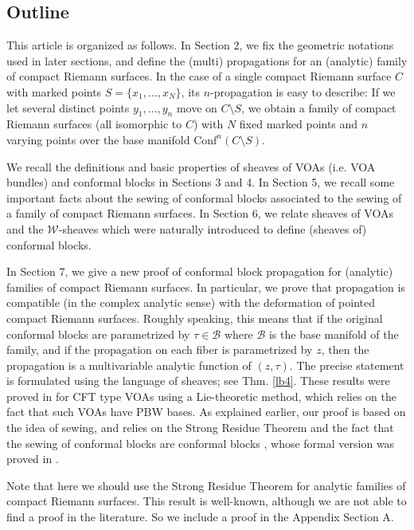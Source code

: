 \documentclass[12pt,a4paper,notitlepage]{article}
\theoremstyle{definition}
\theoremstyle{plain}
\newcommand{\mc}{\mathcal}
\newcommand{\Conf}{\mathrm{Conf}}
\newcommand{\scr}{\mathscr}
\numberwithin{equation}{section}
\begin{document}
\subsection*{Outline}


This article is organized as follows. In Section 2, we fix the geometric notations used in later sections, and define the (multi) propagations for an (analytic) family of compact Riemann surfaces. In the case of a single compact Riemann surface $C$ with marked points $S=\{x_1,\dots,x_N\}$, its $n$-propagation is easy to describe: If we let several distinct points $y_1,\dots,y_n$ move on $C\setminus S$, we obtain a family of compact Riemann surfaces (all isomorphic to $C$) with $N$ fixed marked points and $n$ varying points over the base manifold $\Conf^n(C\setminus S)$.

We recall the definitions and basic properties of sheaves of VOAs (i.e. VOA bundles) and conformal blocks in Sections 3 and 4. In Section 5, we recall some important facts about the sewing of conformal blocks associated to the sewing of a family of compact Riemann surfaces. In Section 6, we relate sheaves of VOAs and the $\scr W$-sheaves which were naturally introduced to define (sheaves of) conformal blocks.

In Section 7, we give a new proof of conformal block propagation for (analytic) families of compact Riemann surfaces. In particular, we prove that propagation is compatible (in the complex analytic sense) with the deformation of pointed compact Riemann surfaces. Roughly speaking, this means that if the original conformal blocks are parametrized by $\tau\in\mc B$ where $\mc B$ is the base manifold of the family, and if the propagation on each fiber is parametrized by $z$, then the propagation is a multivariable analytic function of $(z,\tau)$. The precise statement is formulated using the language of sheaves; see Thm. \ref{lb4}. These results were proved in \cite[Thm. 3.6]{Cod19} for CFT type VOAs using a Lie-theoretic method, which relies on the fact that such VOAs have PBW bases. As explained earlier, our proof is based on the idea of sewing, and relies on the Strong Residue Theorem and the fact that the sewing of conformal blocks are conformal blocks \cite[Thm. 11.2]{Gui20}, whose  formal version was proved in \cite{DGT19b}. 

Note that here we should use the Strong Residue Theorem for analytic families of compact Riemann surfaces. This result is well-known, although we are not able to find a proof in the literature. So we include a proof in the Appendix Section A.
\end{document}
